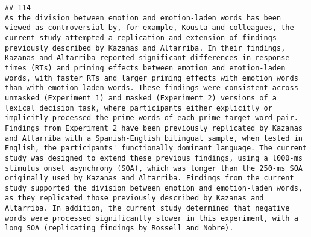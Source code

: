\documentclass[
  english,
  man]{apa6}
\begin{document}
\begin{verbatim}
## 114                                                                                                                                                                                                                                                                                                                                                                                                                                                                                                                                                                                                                                                                                                                                                                                                                                                                                                                                                                                                                                                                                                                                            As the division between emotion and emotion-laden words has been viewed as controversial by, for example, Kousta and colleagues, the current study attempted a replication and extension of findings previously described by Kazanas and Altarriba. In their findings, Kazanas and Altarriba reported significant differences in response times (RTs) and priming effects between emotion and emotion-laden words, with faster RTs and larger priming effects with emotion words than with emotion-laden words. These findings were consistent across unmasked (Experiment 1) and masked (Experiment 2) versions of a lexical decision task, where participants either explicitly or implicitly processed the prime words of each prime-target word pair. Findings from Experiment 2 have been previously replicated by Kazanas and Altarriba with a Spanish-English bilingual sample, when tested in English, the participants' functionally dominant language. The current study was designed to extend these previous findings, using a l000-ms stimulus onset asynchrony (SOA), which was longer than the 250-ms SOA originally used by Kazanas and Altarriba. Findings from the current study supported the division between emotion and emotion-laden words, as they replicated those previously described by Kazanas and Altarriba. In addition, the current study determined that negative words were processed significantly slower in this experiment, with a long SOA (replicating findings by Rossell and Nobre).

\end{verbatim}
\end{document}
